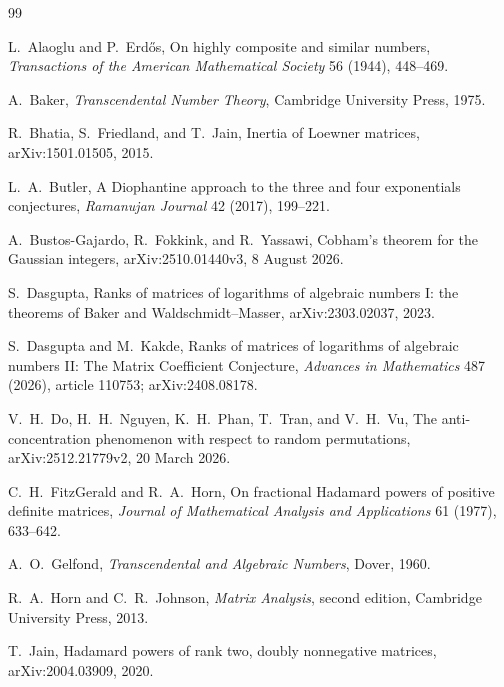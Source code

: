 \documentclass[11pt,oneside]{article}
\theoremstyle{definition}
\theoremstyle{remark}
\begin{document}
\begin{thebibliography}{99}
\raggedright

L.~Alaoglu and P.~Erd\H{o}s,
\newblock On highly composite and similar numbers,
\newblock \emph{Transactions of the American Mathematical Society} 56 (1944), 448--469.

A.~Baker,
\newblock \emph{Transcendental Number Theory},
\newblock Cambridge University Press, 1975.

R.~Bhatia, S.~Friedland, and T.~Jain,
\newblock Inertia of Loewner matrices,
\newblock arXiv:1501.01505, 2015.

L.~A.~Butler,
\newblock A Diophantine approach to the three and four exponentials conjectures,
\newblock \emph{Ramanujan Journal} 42 (2017), 199--221.

A.~Bustos-Gajardo, R.~Fokkink, and R.~Yassawi,
\newblock Cobham's theorem for the Gaussian integers,
\newblock arXiv:2510.01440v3, 8 August 2026.

S.~Dasgupta,
\newblock Ranks of matrices of logarithms of algebraic numbers I: the theorems of Baker and Waldschmidt--Masser,
\newblock arXiv:2303.02037, 2023.

S.~Dasgupta and M.~Kakde,
\newblock Ranks of matrices of logarithms of algebraic numbers II: The Matrix Coefficient Conjecture,
\newblock \emph{Advances in Mathematics} 487 (2026), article 110753;
 arXiv:2408.08178.

V.~H.~Do, H.~H.~Nguyen, K.~H.~Phan, T.~Tran, and V.~H.~Vu,
\newblock The anti-concentration phenomenon with respect to random permutations,
\newblock arXiv:2512.21779v2, 20 March 2026.

C.~H.~FitzGerald and R.~A.~Horn,
\newblock On fractional Hadamard powers of positive definite matrices,
\newblock \emph{Journal of Mathematical Analysis and Applications} 61 (1977), 633--642.

A.~O.~Gelfond,
\newblock \emph{Transcendental and Algebraic Numbers},
\newblock Dover, 1960.

R.~A.~Horn and C.~R.~Johnson,
\newblock \emph{Matrix Analysis}, second edition,
\newblock Cambridge University Press, 2013.

T.~Jain,
\newblock Hadamard powers of rank two, doubly nonnegative matrices,
\newblock arXiv:2004.03909, 2020.


\end{thebibliography}
\end{document}
